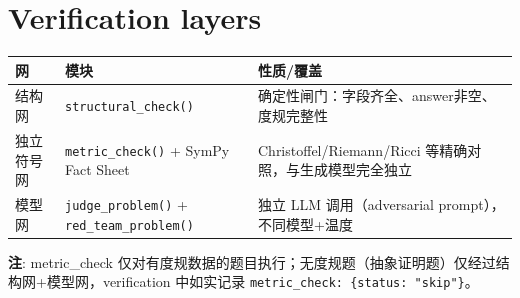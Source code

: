 \documentclass[11pt,a4paper]{article}
\begin{document}
\section{Verification layers}
\label{sec:verification}

\begin{table}[h]\centering
\begin{tabular}{llp{7cm}}
\toprule
\textbf{网} & \textbf{模块} & \textbf{性质/覆盖} \\
\midrule
结构网     & \texttt{structural\_check()} & 确定性闸门：字段齐全、answer非空、度规完整性 \\
独立符号网 & \texttt{metric\_check()} + SymPy Fact Sheet & Christoffel/Riemann/Ricci 等精确对照，与生成模型完全独立 \\
模型网     & \texttt{judge\_problem()} + \texttt{red\_team\_problem()} & 独立 LLM 调用（adversarial prompt），不同模型+温度 \\
\bottomrule
\end{tabular}
\end{table}

\small\noindent
\textbf{注}: metric\_check 仅对有度规数据的题目执行；无度规题（抽象证明题）仅经过结构网+模型网，verification 中如实记录 \texttt{metric\_check: \{status: "skip"\}}。
\end{document}
